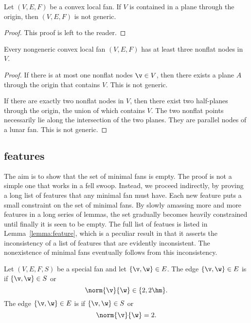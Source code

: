 \begin{lemma}[]
Let $(V,E,F)$ be a convex local fan.  If $V$ is contained in a plane
through the origin, then $(V,E,F)$ is not generic.
\end{lemma}

\begin{proof} This proof is left to the reader.
\end{proof}

\begin{lemma}[]\label{lemma:3-nonflat}
Every nongeneric convex local fan $(V,E,F)$ has at least three nonflat
nodes in $V$.
\end{lemma}

\begin{proof}
If there is at most one nonflat nodes $\v\in V$, then there exists
a plane $A$ through the origin that contains $V$.  This is not
generic.

If there are exactly two nonflat nodes in $V$, then
there exist two half-planes through the origin, the union of which contains
$V$.  The two nonflat points necessarily lie along the intersection
of the two planes.  They are parallel nodes of a lunar fan.
This is not generic.
\end{proof}

\subsection{features}

The aim is to show that the set of minimal fans is empty.  The proof
is not a simple one that works in a fell swoop.  Instead, we proceed
indirectly, by proving a long list of features that any minimal fan
must have.  Each new feature puts a small constraint on the set of
minimal fans.  By slowly amassing more and more features in a long
series of lemmas, the set
gradually becomes heavily constrained until finally it is seen to be
empty.  The full list of featues is listed in
Lemma~\ref{lemma:feature}, which is a peculiar result in that it
asserts the inconsistency of a list of features that are evidently
inconsistent.    The nonexistence of minimal fans eventually follows
from this inconsistency.


\begin{definition}
 Let $(V,E,F,S)$ be a special fan
and let $\{\v,\w\}\in E$.  The edge $\{\v,\w\}\in E$ is
 if $\{\v,\w\}\in S$ or
\[ 
\norm{\v}{\w}\in\{2,2\hm\}.
\] 
The edge $\{\v,\w\}\in E$ is  if $\{\v,\w\}\in S$ or
\[ 
\norm{\v}{\w}=2.
\] 
\end{definition}

